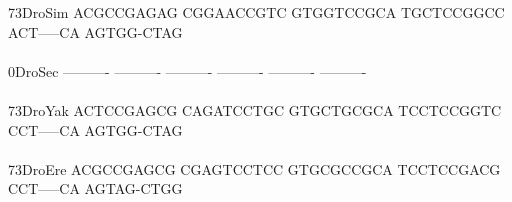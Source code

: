 \documentclass[11pt,twoside,reqno,a4paper]{article}
\begin{document}
{73\hspace*{2\charwidth}DroSim	ACGCCGAGAG	CGGAACCGTC	GTGGTCCGCA	TGCTCCGGCC	ACT-----CA	AGTGG-CTAG	\\
\hspace*{4\charwidth}\hspace*{7\charwidth}\hspace*{1\charwidth}\hspace*{1\charwidth}\hspace*{1\charwidth}\hspace*{1\charwidth}\hspace*{1\charwidth}\hspace*{1\charwidth}\\
0\hspace*{3\charwidth}DroSec	----------	----------	----------	----------	----------	----------	\\
\hspace*{4\charwidth}\hspace*{7\charwidth}\hspace*{1\charwidth}\hspace*{1\charwidth}\hspace*{1\charwidth}\hspace*{1\charwidth}\hspace*{1\charwidth}\hspace*{1\charwidth}\\
73\hspace*{2\charwidth}DroYak	ACTCCGAGCG	CAGATCCTGC	GTGCTGCGCA	TCCTCCGGTC	CCT-----CA	AGTGG-CTAG	\\
\hspace*{4\charwidth}\hspace*{7\charwidth}\hspace*{1\charwidth}\hspace*{1\charwidth}\hspace*{1\charwidth}\hspace*{1\charwidth}\hspace*{1\charwidth}\hspace*{1\charwidth}\\
73\hspace*{2\charwidth}DroEre	ACGCCGAGCG	CGAGTCCTCC	GTGCGCCGCA	TCCTCCGACG	CCT-----CA	AGTAG-CTGG	\\
\hspace*{4\charwidth}\hspace*{7\charwidth}\hspace*{1\charwidth}\hspace*{1\charwidth}\hspace*{1\charwidth}\hspace*{1\charwidth}\hspace*{1\charwidth}\hspace*{1\charwidth}\\
}
\end{document}
